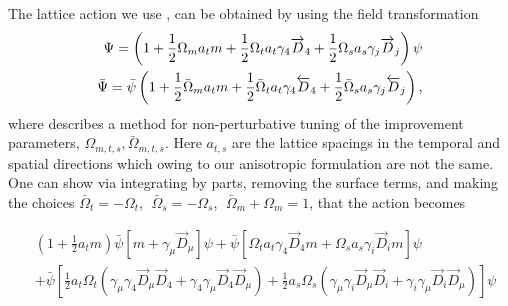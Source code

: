 The lattice action we use \cite{Edwards:2008ja}, can be obtained by using the field transformation
\begin{align}
\Psi = \left( 1 + \frac{1}{2} \Omega_m a_t m + \frac{1}{2} \Omega_t a_t \gamma_4 \overrightarrow{D}_4 + \frac{1}{2} \Omega_s a_s \gamma_j \overrightarrow{D}_j \right) \psi  \notag \\
\bar{\Psi} = \bar{\psi}\left( 1 + \frac{1}{2} \bar{\Omega}_m a_t m + \frac{1}{2} \bar{\Omega}_t a_t \gamma_4 \overleftarrow{D}_4 + \frac{1}{2} \bar{\Omega}_s a_s \gamma_j \overleftarrow{D}_j \right), 
\end{align}
where \cite{Chen:2000ej} describes a method for non-perturbative tuning of the improvement parameters, $\Omega_{m,t,s},\bar{\Omega}_{m,t,s}$. Here $a_{t,s}$ are the lattice spacings in the temporal and spatial directions which owing to our anisotropic formulation are not the same. One can show via integrating by parts, removing the surface terms, and making the choices $\bar{\Omega}_t = - \Omega_t$,   $\;\bar{\Omega}_s = - \Omega_s$,   $\;\bar{\Omega}_m + \Omega_m = 1$, that  the  action becomes 

\begin{align*}
&\left( 1 + \frac{1}{2}a_tm\right) \bar{\psi} \left[ m + \gamma_\mu \overrightarrow{D}_\mu \right] \psi + \bar{\psi}\left[ \Omega_t a_t \gamma_4 \overrightarrow{D}_4 m + \Omega_s a_s \gamma_i \overrightarrow{D}_i m \right] \psi \\
& + \bar{\psi} \left[  \frac{1}{2} a_t \Omega_t \left( \gamma_\mu \gamma_4 \overrightarrow{D}_\mu \overrightarrow{D}_4 + \gamma_4 \gamma_\mu \overrightarrow{D}_4 \overrightarrow{D}_\mu \right) + \frac{1}{2}a_s \Omega_s \left( \gamma_\mu \gamma_i \overrightarrow{D}_\mu \overrightarrow{D}_i + \gamma_i \gamma_\mu \overrightarrow{D}_i \overrightarrow{D}_\mu \right) \right] \psi 
\end{align*}


